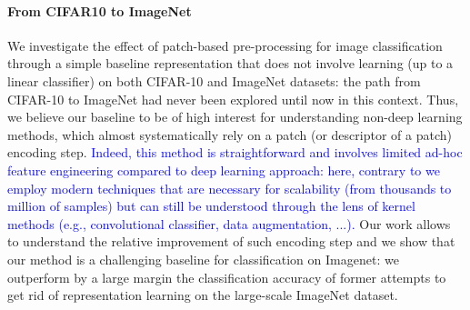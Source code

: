 \documentclass{article} %
\newcommand{\Edouard}[1]{\textcolor{blue}{#1}}
\begin{document}
\paragraph{From CIFAR10 to ImageNet} We investigate the effect of patch-based pre-processing for image classification through a simple baseline representation that does not involve learning  (up to a linear classifier) on both CIFAR-10 and ImageNet datasets: the path from CIFAR-10 to ImageNet had never been explored until now in this context.  Thus, we believe our baseline to be of high interest for understanding non-deep learning methods, which almost systematically rely on a patch (or descriptor of a patch) encoding step.  \Edouard{Indeed, this method is  straightforward and involves limited ad-hoc feature engineering compared to deep learning approach: here, contrary to \citep{mairal2016end, coates2011analysis, recht2019imagenet, shankar2020neural, li2019enhanced} we  employ modern  techniques that are necessary for scalability (from thousands to million of samples) but can still be understood through the lens of kernel methods (e.g., convolutional classifier, data augmentation, ...).}  Our work allows to understand the relative improvement of such encoding step and we show that our method is a challenging baseline for classification on Imagenet:  we outperform by a large margin the classification accuracy of former attempts to get rid of representation learning on the large-scale ImageNet dataset.




\end{document}
